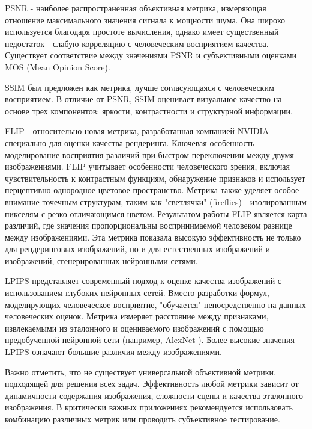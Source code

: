 \documentclass[a4paper,hidelinks,12pt]{article}
\begin{document}
\par

PSNR - наиболее распространенная объективная метрика, измеряющая отношение максимального значения сигнала к мощности шума. Она широко используется 
благодаря простоте вычисления, однако имеет существенный недостаток - слабую корреляцию с человеческим восприятием качества. 
Существует соответствие между значениями PSNR и субъективными оценками MOS (Mean Opinion Score). 

SSIM \cite{ssim} был предложен как 
метрика, лучше согласующаяся с человеческим восприятием. В отличие от PSNR, SSIM оценивает визуальное качество на основе трех 
компонентов: яркости, контрастности и структурной информации. 

FLIP \cite{flip} - относительно новая метрика, разработанная компанией NVIDIA специально для оценки качества рендеринга. Ключевая особенность \cite{flip} - моделирование восприятия различий при быстром переключении между двумя изображениями.
FLIP учитывает особенности человеческого зрения, включая чувствительность к контрастным функциям, обнаружение признаков и использует перцептивно-однородное цветовое пространство. 
Метрика также уделяет особое внимание точечным структурам, таким как "светлячки" (fireflies) - изолированным пикселям с резко отличающимся цветом. 
Результатом работы FLIP является карта различий, где значения пропорциональны воспринимаемой человеком разнице между изображениями. 
Эта метрика показала высокую эффективность не только для рендеринговых изображений, но и для естественных изображений и изображений, сгенерированных нейронными сетями.

LPIPS \cite{lpips} представляет современный подход к оценке качества изображений с использованием глубоких нейронных сетей. Вместо разработки формул, моделирующих человеческое восприятие, \cite{lpips} "обучается" непосредственно на данных человеческих оценок.
Метрика измеряет расстояние между признаками, извлекаемыми из эталонного и оцениваемого изображений с помощью предобученной нейронной сети (например, AlexNet \cite{alexnet}). Более высокие значения LPIPS означают большие различия между изображениями.

Важно отметить, что не существует универсальной объективной метрики, подходящей для решения всех задач. Эффективность любой метрики зависит от динамичности содержания изображения, сложности 
сцены и качества эталонного изображения. В критически важных приложениях рекомендуется использовать комбинацию различных метрик или проводить субъективное тестирование.
\end{document}
